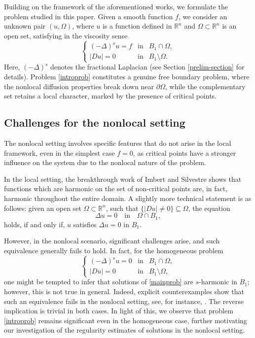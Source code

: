 \documentclass[reqno,11pt]{amsart}
\numberwithin{equation}{section}
\numberwithin{equation}{section}
\begin{document}
Building on the framework of the aforementioned works, we formulate the problem studied in this paper. Given a smooth function \( f \), we consider an unknown pair \( (u, \Omega) \), where \( u \) is a function defined in \( \mathbb{R}^n \) and \( \Omega \subset \mathbb{R}^n \) is an open set, satisfying in the viscosity sense
\begin{equation}\label{introprob}
\left\{
\begin{array}{rcl}
(-\Delta)^s u = f & \text{in} & B_1 \cap \Omega, \\
|Du| = 0 & \text{in} & B_1 \setminus \Omega.
\end{array}
\right.
\end{equation}  
Here, \( (-\Delta)^s \) denotes the fractional Laplacian (see Section \ref{prelim-section} for details). Problem \eqref{introprob} constitutes a genuine free boundary problem, where the nonlocal diffusion properties break down near \( \partial \Omega \), while the complementary set retains a local character, marked by the presence of critical points.

\subsection{Challenges for the nonlocal setting} The nonlocal setting involves specific features that do not arise in the local framework, even in the simplest case $f=0$, as critical points have a stronger influence on the system due to the nonlocal nature of the problem. 

In the local setting, the breakthrough work of Imbert and Silvestre \cite{IS13} shows that functions which are harmonic on the set of non-critical points are, in fact, harmonic throughout the entire domain. A slightly more technical statement is as follows: given an open set $\Omega \subset \mathbb{R}^n$, such that $\{ |Du| \neq 0 \} \subseteq \Omega$, the equation
\begin{equation}\label{Oharmonic}
\Delta u = 0 \quad \mbox{in} \quad \Omega \cap B_1,    
\end{equation}
holds, if and only if, $u$ satisfies $\Delta u = 0$ in $B_1$.

However, in the nonlocal scenario, significant challenges arise, and such equivalence generally fails to hold. In fact, for the homogeneous problem
\begin{equation}\label{mainprob}  
\left\{  
\begin{array}{rcl}  
(-\Delta)^s u = 0 & \text{in} & B_1 \cap \Omega, \\  
|Du| = 0 & \text{in} & B_1 \setminus \Omega,  
\end{array}  
\right.  
\end{equation}  
one might be tempted to infer that solutions of \eqref{mainprob} are $s$-harmonic in $B_1$; however, this is not true in general. Indeed, explicit counterexamples show that such an equivalence fails in the nonlocal setting, see, for instance, \cite{APT, PT}. The reverse implication is trivial in both cases. In light of this, we observe that problem \eqref{introprob} remains significant even in the homogeneous case, further motivating our investigation of the regularity estimates of solutions in the nonlocal setting.
\end{document}
